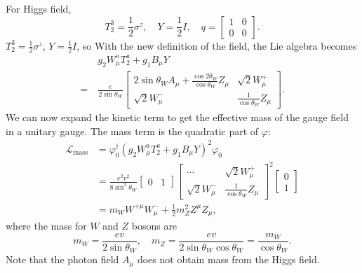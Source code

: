 \documentclass[aps,rmp,twocolumn,superscriptaddress,nofootinbib]{revtex4-2}
\begin{document}
For Higgs field, 
\begin{equation}
	T^3_2 = \frac{1}{2}\sigma^z, \quad
	Y = \frac{1}{2} I,\quad 
	q = \begin{bmatrix}
		1 & 0 \\ 0 & 0
	\end{bmatrix}.
\end{equation}
$T^3_2 = \frac{1}{2}\sigma^z$, $Y=\frac{1}{2}I$, so 
With the new definition of the field, the Lie algebra becomes
\begin{equation*}
\begin{aligned}
	&\ g_2 W^a_\mu T_2^a + g_1 B_\mu Y \\
	=&\ \frac{e}{2 \sin{\theta_W}} 
	\begin{bmatrix}
		2\sin{\theta_W} A_\mu + \frac{\cos{2\theta_W}}{\cos{\theta_W}} Z_\mu & \sqrt{2} W^+_\mu \\
		\sqrt{2} W_\mu^- & \frac{1}{\cos{\theta_W}} Z_\mu
	\end{bmatrix}.
\end{aligned}
\end{equation*}
We can now expand the kinetic term to get the effective mass of the gauge field in a unitary gauge. 
The mass term is the quadratic part of $\varphi$:
\begin{equation*}
\begin{aligned}
	\mathcal L_{\mathrm{mass}} 
	&= \varphi_0^\dagger \left(g_2 W^a_\mu T_2^a + g_1 B_\mu Y\right)^2 \varphi_0 \\
	&= \frac{e^2v^2}{8 \sin^2{\theta_W}} 
	\begin{bmatrix}
		0 & 1
	\end{bmatrix} 
	\begin{bmatrix}
		\cdots & \sqrt{2} W^+_\mu \\
		\sqrt{2} W_\mu^- & \frac{1}{\cos{\theta_W}} Z_\mu
	\end{bmatrix}^2
	\begin{bmatrix}
		0 \\ 1
	\end{bmatrix} \\
	&= m_W W^{+\mu} W_\mu^- + \frac{1}{2}m_Z^2 Z^\mu Z_\mu,
\end{aligned}
\end{equation*}
where the mass for $W$ and $Z$ bosons are
\begin{equation*}
	m_W = \frac{ev}{2 \sin{\theta_W}}, \quad 
	m_Z = \frac{e v}{2\sin{\theta_W}\cos{\theta_W}} = \frac{m_W}{\cos{\theta_W}}.
\end{equation*}
Note that the photon field $A_\mu$ does not obtain mass from the Higgs field.
\end{document}
